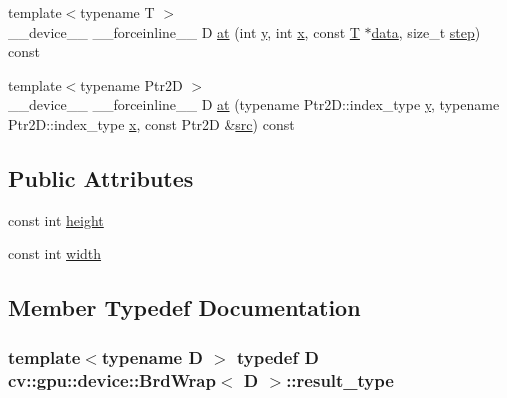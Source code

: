 \begin{DoxyCompactItemize}
\item 
{\footnotesize template$<$typename T $>$ }\\\-\_\-\-\_\-device\-\_\-\-\_\- \-\_\-\-\_\-forceinline\-\_\-\-\_\- D \hyperlink{structcv_1_1gpu_1_1device_1_1BrdWrap_a1073b020a2fc950d90595ae8f58a8f90}{at} (int \hyperlink{highgui__c_8h_af1202c02b14870c18fb3a1da73e9e7c7}{y}, int \hyperlink{highgui__c_8h_a6150e0515f7202e2fb518f7206ed97dc}{x}, const \hyperlink{calib3d_8hpp_a3efb9551a871ddd0463079a808916717}{T} $\ast$\hyperlink{legacy_8hpp_ab9fe6c09e6d02865a953fffc12fe6ca0}{data}, size\-\_\-t \hyperlink{legacy_8hpp_abc16e65f240ed0c8f3e876e8732c0a33}{step}) const 
\item 
{\footnotesize template$<$typename Ptr2\-D $>$ }\\\-\_\-\-\_\-device\-\_\-\-\_\- \-\_\-\-\_\-forceinline\-\_\-\-\_\- D \hyperlink{structcv_1_1gpu_1_1device_1_1BrdWrap_a4ca5a1175e196356aa72ba4d65f46e06}{at} (typename Ptr2\-D\-::index\-\_\-type \hyperlink{highgui__c_8h_af1202c02b14870c18fb3a1da73e9e7c7}{y}, typename Ptr2\-D\-::index\-\_\-type \hyperlink{highgui__c_8h_a6150e0515f7202e2fb518f7206ed97dc}{x}, const Ptr2\-D \&\hyperlink{legacy_8hpp_a371cd109b74033bc4366f584edd3dacc}{src}) const 
\end{DoxyCompactItemize}
\subsection*{Public Attributes}
\begin{DoxyCompactItemize}
\item 
const int \hyperlink{structcv_1_1gpu_1_1device_1_1BrdWrap_abd7d1a117067e85f12317cc3309e63e8}{height}
\item 
const int \hyperlink{structcv_1_1gpu_1_1device_1_1BrdWrap_a9c48b6a8dabfe1729802ba261ebf254d}{width}
\end{DoxyCompactItemize}


\subsection{Member Typedef Documentation}
\hypertarget{structcv_1_1gpu_1_1device_1_1BrdWrap_a02e0559636bf2be72d95f0919b260559}{
\subsubsection[{result\-\_\-type}]{\setlength{\rightskip}{0pt plus 5cm}template$<$typename D $>$ typedef D {\bf cv\-::gpu\-::device\-::\-Brd\-Wrap}$<$ D $>$\-::{\bf result\-\_\-type}}}\label{structcv_1_1gpu_1_1device_1_1BrdWrap_a02e0559636bf2be72d95f0919b260559}


